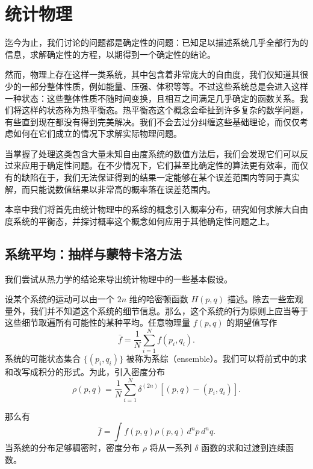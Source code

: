 \chapter{统计物理}

迄今为止，我们讨论的问题都是确定性的问题：已知足以描述系统几乎全部行为的信息，求解确定性的方程，以期得到一个确定性的结论。

然而，物理上存在这样一类系统，其中包含着非常庞大的自由度，我们仅知道其很少的一部分整体性质，例如能量、压强、体积等等。不过这些系统总是会进入这样一种状态：这些整体性质不随时间变换，且相互之间满足几乎确定的函数关系。我们将这样的状态称为热平衡态。热平衡态这个概念会牵扯到许多复杂的数学问题，有些直到现在都没有得到完美解决。我们不会去过分纠缠这些基础理论，而仅仅考虑如何在它们成立的情况下求解实际物理问题。

当掌握了处理这类包含大量未知自由度系统的数值方法后，我们会发现它们可以反过来应用于确定性问题。在不少情况下，它们甚至比确定性的算法更有效率，而仅有的缺陷在于，我们无法保证得到的结果一定能够在某个误差范围内等同于真实解，而只能说数值结果以非常高的概率落在误差范围内。

本章中我们将首先由统计物理中的系综的概念引入概率分布，研究如何求解大自由度系统的平衡态，并探讨概率这个概念如何应用于其他确定性问题之上。

\section{系统平均：抽样与蒙特卡洛方法}

我们尝试从热力学的结论来导出统计物理中的一些基本假设。

设某个系统的运动可以由一个 $2n$ 维的哈密顿函数 $H(p,q)$ 描述。除去一些宏观量外，我们并不知道这个系统的细节信息。那么，这个系统的行为原则上应当等于这些细节取遍所有可能性的某种平均。任意物理量 $f(p,q)$ 的期望值写作
\begin{equation}
 \bar f=\frac1N\sum_{i=1}^{N}f(p_i,q_i).
\tag{7.1.1}
\end{equation}
系统的可能状态集合 $\{(p_i,q_i)\}$ 被称为系综（ensemble）。我们可以将前式中的求和改写成积分的形式。为此，引入密度分布
\begin{equation}
 \rho(p,q)=\frac1N\sum_{i=1}^{N}\delta^{(2n)}\!\left[(p,q)-(p_i,q_i)\right].
\tag{7.1.2}
\end{equation}

那么有
\begin{equation}
 \bar f=\int f(p,q)\rho(p,q)\,d^np\,d^nq.
\tag{7.1.3}
\end{equation}
当系统的分布足够稠密时，密度分布 $\rho$ 将从一系列 $\delta$ 函数的求和过渡到连续函数。

